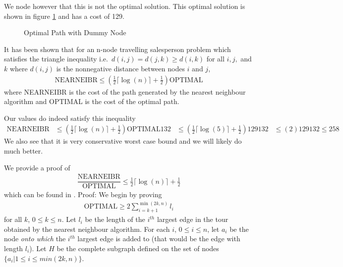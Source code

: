 We node however that this is not the optimal solution. This optimal solution is shown in 
figure \ref{fig:optDummy} and has a cost of 129.

\begin{figure}
\centering
{}
\caption{Optimal Path with Dummy Node}
\label{fig:optDummy}
\end{figure}



It has been shown that for an n-node travelling salesperson problem which satisfies the triangle inequality i.e.\ $d(i,j) = d(j,k) \geq d(i,k)$ for all $i,j,$ and $k$ where $d(i,j)$ is the nonnegative distance between nodes $i$ and $j$, 
\begin{align*}
\text{NEARNEIBR} \leq (\frac{1}{2} \lceil \log(n) \rceil + \frac{1}{2})\text{OPTIMAL}
\end{align*}
where NEARNEIBR is the cost of the path generated by the nearest neighbour algorithm and OPTIMAL is the cost of the optimal path. 

Our values do indeed satisfy this inequality
\begin{align*}
\text{NEARNEIBR} &\leq (\frac{1}{2} \lceil \log(n) \rceil + \frac{1}{2})\text{OPTIMAL}
132 &\leq (\frac{1}{2} \lceil \log(5) \rceil + \frac{1}{2})129
132 &\leq (2)129
132 \leq 258 
\end{align*}
We also see that it is very conservative worst case bound and we will likely do much better.

We provide a proof of
\begin{align}
\dfrac{\text{NEARNEIBR}}{\text{OPTIMAL}} \leq \frac{1}{2} \lceil \log(n) \rceil + \frac{1}{2}
\end{align}
which can be found in \cite{rosenkrantz74}. 
Proof:
We begin by proving 
\begin{align}
\text{OPTIMAL} \geq 2 \sum^{\min(2k,n)}_{i=k+1} l_i \label{eq:showFirst}
\end{align}
for all $k$, $0\leq k \leq n$. 
Let $l_i$ be the length of the $i^{th}$ largest edge in the tour obtained by the nearest neighbour algorithm. For each $i$, $0 \leq i \leq n$, let $a_i$ be the node \textit{onto which} the $i^{th}$ largest edge is added to (that would be the edge with length $l_i$). Let $H$ be the complete subgraph defined on the set of nodes $\{a_i | 1 \leq i \leq min(2k,n)\}$.

